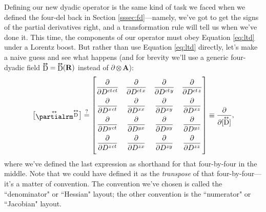\documentclass[12pt]{article}
\renewcommand{\vv}[1]{\mathbf{#1}}
\newcommand{\tightoverset}[2]{%
  \mathop{#2}\limits^{\vbox to -.5ex{\kern-0.75ex\hbox{$#1$}\vss}}}
\newcommand{\inlinedy}[1]{\tightoverset{\text{\tiny$\bm\leftrightarrow$}}{#1}}
\newcommand{\superoverset}[2]{%
  \mathop{#2}\limits^{\vbox to -.5ex{\kern-0.95ex\hbox{$#1$}\vss}}}
\newcommand{\superdy}[1]{\superoverset{\text{\tiny$\bm\leftrightarrow$}}{#1}}
\newcommand{\capdy}[1]{ \overset{ \text{\tiny$\bm\leftrightarrow$} }{\vphantom{\text{\small{A}}}\smash{#1}} }
\begin{document}
Defining our new dyadic operator is the same kind of task we faced when we defined the four-del back in Section \ref{sssec:fd}---namely, we've got to get the signs of the partial derivatives right, and a transformation rule will tell us when we've done it. This time, the components of our operator must obey Equation \ref{eq:ltd} under a Lorentz boost. But rather than use Equation \ref{eq:ltd} directly, let's make a naive guess and see what happens (and for brevity we'll use a generic four-dyadic field $\inlinedy{\mathrm{D}} = \inlinedy{\mathrm{D}} (\vv R)$ instead of $\partialup \otimes \vv A$):
\begin{equation*}
\begin{bmatrix}
\capdy{\partialrm} {}^{\superdy{\mathrm{D}}} \\[-.375ex]
\end{bmatrix}
\stackrel{?}{=}
\begin{bmatrix}
\\[-2ex]
\dfrac{\partial}{\partial D^{ct \mkern1.5mu ct}} & \dfrac{\partial}{\partial D^{ct \mkern1.5mu x}} & \dfrac{\partial}{\partial D^{ct \mkern1.5mu y}} & \dfrac{\partial}{\partial D^{ct \mkern1.5mu z}} \\[2ex]
\dfrac{\partial}{\partial D^{x \mkern1.5mu ct}} & \dfrac{\partial}{\partial D^{x x}} & \dfrac{\partial}{\partial D^{x y}} & \dfrac{\partial}{\partial D^{x z}}  \\[2ex]
\dfrac{\partial}{\partial D^{y \mkern1.5mu ct}} & \dfrac{\partial}{\partial D^{y x}} & \dfrac{\partial}{\partial D^{y y}} & \dfrac{\partial}{\partial D^{y z}}  \\[2ex]
\dfrac{\partial}{\partial D^{z \mkern1.5mu ct}} & \dfrac{\partial}{\partial D^{z x}} & \dfrac{\partial}{\partial D^{z y}} & \dfrac{\partial}{\partial D^{z z}} \\[2ex]
\end{bmatrix}
\equiv
\dfrac{\partial}{\partial [ \capdy{\mathrm{D}} ]}
,
\end{equation*}
where we've defined the last expression as shorthand for that four-by-four in the middle. Note that we could have defined it as the \emph{transpose} of that four-by-four---it's a matter of convention. The convention we've chosen is called the ``denominator" or ``Hessian" layout; the other convention is the ``numerator" or ``Jacobian" layout.
\end{document}
